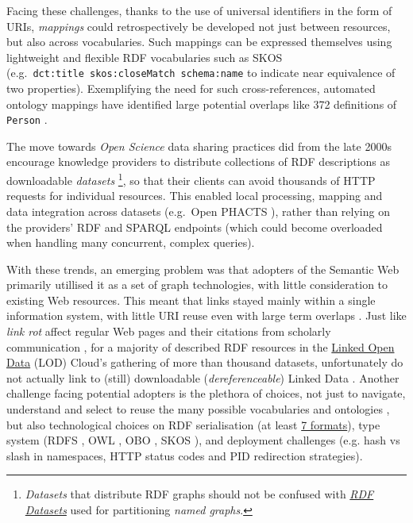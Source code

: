 \documentclass[fleqn,10pt,lineno]{wlpeerjlua}
\begin{document}
Facing these challenges, thanks to the use of universal identifiers in the form of URIs, \emph{mappings} could retrospectively be developed not just between resources, but also across vocabularies. Such mappings can be expressed themselves using lightweight and flexible RDF vocabularies such as SKOS \autocite{w3-skos-primer} (e.g.~\texttt{dct:title\ skos:closeMatch\ schema:name} to indicate near equivalence of two properties). Exemplifying the need for such cross-references, automated ontology mappings have identified large potential overlaps like 372 definitions of \texttt{Person} \autocite{huHowMatchableAre2011a}.

The move towards \emph{Open Science} data sharing practices did from the late 2000s encourage knowledge providers to distribute collections of RDF descriptions as downloadable \emph{datasets} \footnote{\emph{Datasets} that distribute RDF graphs should not be confused with \href{https://www.w3.org/TR/rdf11-concepts/\#section-dataset}{\emph{RDF Datasets}} used for partitioning \emph{named graphs}.}, so that their clients can avoid thousands of HTTP requests for individual resources. This enabled local processing, mapping and data integration across datasets (e.g.~Open PHACTS \autocite{grothAPIcentricLinkedData2014b}), rather than relying on the providers' RDF and SPARQL endpoints (which could become overloaded when handling many concurrent, complex queries).

With these trends, an emerging problem was that adopters of the Semantic Web primarily utillised it as a set of graph technologies, with little consideration to existing Web resources. This meant that links stayed mainly within a single information system, with little URI reuse even with large term overlaps \autocite{kamdarSystematicAnalysisTerm2017a}. Just like \emph{link rot} affect regular Web pages and their citations from scholarly communication \autocite{kleinScholarlyContextNot2014a}, for a majority of described RDF resources in the \href{https://lod-cloud.net/}{Linked Open Data} (LOD) Cloud's gathering of more than thousand datasets, unfortunately do not actually link to (still) downloadable (\emph{dereferenceable}) Linked Data \autocite{polleresMoreDecentralizedVision2020a}. Another challenge facing potential adopters is the plethora of choices, not just to navigate, understand and select to reuse the many possible vocabularies and ontologies \autocite{carrieroLandscapeOntologyReuse2020a}, but also technological choices on RDF serialisation (at least \href{https://www.w3.org/TR/rdf11-primer/\#section-graph-syntax}{7 formats}), type system (RDFS \autocite{w3-rdf-schema}, OWL \autocite{w3-owl2-overview}, OBO \autocite{tirmiziMappingOBOOWL2011a}, SKOS \autocite{w3-skos-primer}), and deployment challenges \autocite{sauermannCoolURIsSemantic2011} (e.g. hash vs slash in namespaces, HTTP status codes and PID redirection strategies).
\end{document}
